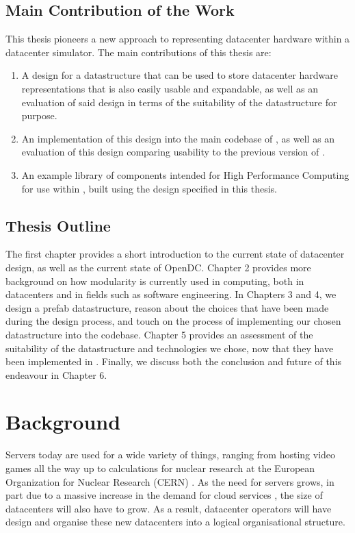 \documentclass[11pt]{article}
\begin{document}
	\subsection{Main Contribution of the Work}
		This thesis pioneers a new approach to representing datacenter hardware within a datacenter simulator.
		The main contributions of this thesis are:
		\begin{enumerate}
			\item A design for a datastructure that can be used to store datacenter hardware representations that is also easily usable and expandable, as well as an evaluation of said design in terms of the suitability of the datastructure for purpose.
			\item An implementation of this design into the main codebase of \opendc{}, as well as an evaluation of this design comparing usability to the previous version of \opendc{}.
			\item An example library of components intended for High Performance Computing for use within \opendc{}, built using the design specified in this thesis.
		\end{enumerate}
	
	\subsection{Thesis Outline}
		The first chapter provides a short introduction to the current state of datacenter design, as well as the current state of OpenDC. 
		Chapter 2 provides more background on how modularity is currently used in computing, both in datacenters and in fields such as software engineering. 
		In Chapters 3 and 4, we design a prefab datastructure, reason about the choices that have been made during the design process, and touch on the process of implementing our chosen datastructure into the \opendc{} codebase.
		Chapter 5 provides an assessment of the suitability of the datastructure and technologies we chose, now that they have been implemented in \opendc{}.
		Finally, we discuss both the conclusion and future of this endeavour in Chapter 6.
	

	

\newpage

\section{Background} \label{sec:background}
	Servers today are used for a wide variety of things, ranging from hosting video games all the way up to calculations for nuclear research at the European Organization for Nuclear Research (CERN) \cite{Andrade2012}.
	As the need for servers grows, in part due to a massive increase in the demand for cloud services \cite{Pring2009}, the size of datacenters will also have to grow.
	As a result, datacenter operators will have design and organise these new datacenters into a logical organisational structure.
\end{document}
